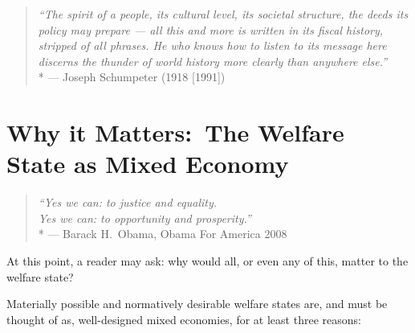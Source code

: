 
\begin{quote}
	\emph{``The spirit of a people, its cultural level, its societal structure, the deeds its policy may prepare --- all this and more is written in its fiscal history, stripped of all phrases.
	He who knows how to listen to its message here discerns the thunder of world history more clearly than anywhere else.''}
	\\*
	--- Joseph Schumpeter (1918 [1991])
\end{quote}




\section{Why it Matters:\ The Welfare State as Mixed Economy}
	\label{sec:why-mixed-economy-matters}

\begin{quote}
	\emph{``Yes we can:
	to justice and equality.
	\\
	Yes we can:
	to opportunity and prosperity.''}
	\\*
	--- Barack H.\ Obama, Obama For America 2008
\end{quote}



At this point, a reader may ask:
why would all, or even any of this, matter to the welfare state?

Materially possible and normatively desirable welfare states are, and must be thought of as, well-designed mixed economies, for at least three reasons:

